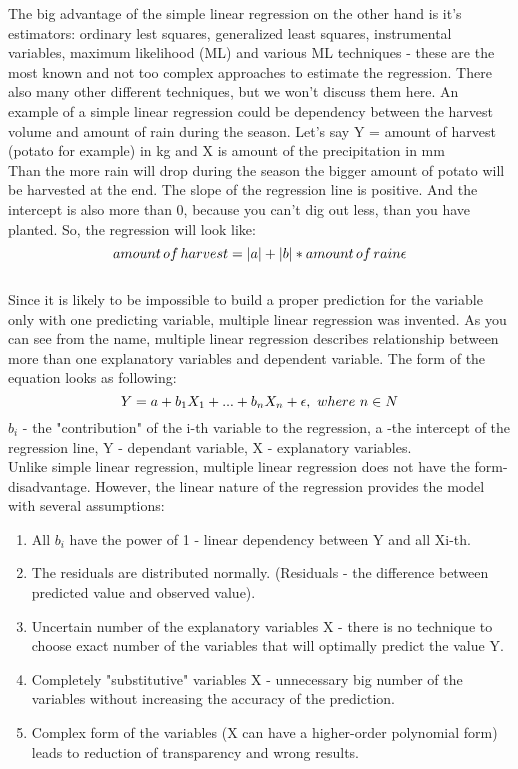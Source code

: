 \documentclass {article}
\begin{document}
The big advantage of the simple linear regression on the other hand is it's estimators: ordinary lest squares, generalized least squares, instrumental variables, maximum likelihood (ML) and various ML techniques - these are the most known and not too complex approaches to estimate the regression. There also many other different techniques, but we won't discuss them here. An example of a simple linear regression could be dependency between the harvest volume and amount of rain during the season. Let's say Y = amount of harvest (potato for example) in kg and X is amount of the precipitation in mm\\ Than the more rain will drop during the season the bigger amount of potato will be harvested at the end. The slope of the regression line is positive. And the intercept is also more than 0, because you can't dig out less, than you have planted. So, the regression will look like:
\[amount \thinspace of \thinspace harvest = |a| + |b|*amount \thinspace of \thinspace rain \epsilon\] \\
Since it is likely to be impossible to build a proper prediction for the variable only with one predicting variable, multiple linear regression was invented. As you can see from the name, multiple linear regression describes relationship between more than one explanatory variables and dependent variable. The form of the equation looks as following:\[ Y = a + b_{1}X_{1}+ ... + b_{n}X_{n} + \epsilon, \thinspace \thinspace where \thinspace \thinspace n \in N\]   
$b_{i}$ - the "contribution" of the i-th variable to the regression, a -the intercept of the regression line, Y - dependant variable, X - explanatory variables.\\
Unlike simple linear regression, multiple linear regression does not have the form-disadvantage. However, the linear nature of the regression provides the model with several assumptions:
\begin{enumerate}
	\item All $b_{i}$ have the power of 1 - linear dependency between Y and all Xi-th.
	\item The residuals are distributed normally. (Residuals - the difference between predicted value and observed value).
	\item Uncertain number of the explanatory variables X - there is no technique to choose exact number of the variables that will optimally predict the value Y.
	\item Completely "substitutive" variables X - unnecessary big number of the variables without increasing the accuracy of the prediction.
	\item Complex form of the variables (X can have a higher-order polynomial form) leads to reduction of transparency and wrong results. 
\end{enumerate}
\end{document}
